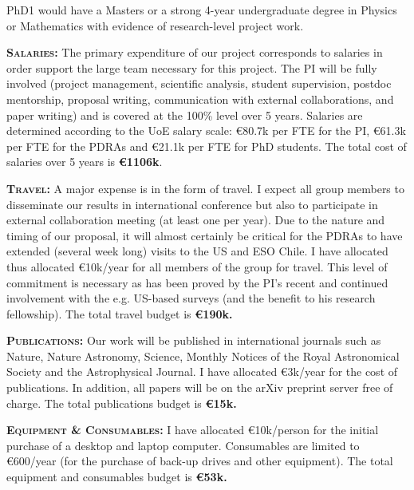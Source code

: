 \smallskip
\smallskip
\noindent
PhD1 would have a Masters or a strong 4-year undergraduate degree in
Physics or Mathematics with evidence of research-level project work.


\smallskip \smallskip
\noindent \textbf{\textsc{Salaries:}} The primary expenditure of our
project corresponds to salaries in order support the large team
necessary for this project.  The PI will be fully involved (project
management, scientific analysis, student supervision, postdoc
mentorship, proposal writing, communication with external
collaborations, and paper writing) and is covered at the 100\% level
over 5 years.  Salaries are determined according to the UoE salary
scale: \euro80.7k per FTE for the PI, \euro61.3k per FTE for the
PDRAs and \euro21.1k per FTE for PhD students.  The total cost of
salaries over 5 years is {\bf \euro 1106k}.

\smallskip \smallskip
\noindent \textbf{\textsc{Travel:}} A major expense is in the form of
travel. I expect all group members to disseminate our results in
international conference but also to participate in external
collaboration meeting (at least one per year). Due to the nature and
timing of our proposal, it will almost certainly be critical for the
PDRAs to have extended (several week long) visits to the US and ESO
Chile. I have allocated thus allocated \euro10k/year for all members
of the group for travel. This level of commitment is necessary as has
been proved by the PI's recent and continued involvement with the
e.g.  US-based surveys (and the benefit to his research
fellowship). The total travel budget is {\bf \euro190k.}

\smallskip
\smallskip
\noindent
\textbf{\textsc{Publications:}}
Our work will be published in international journals such as Nature,
Nature Astronomy, Science, Monthly Notices of the Royal Astronomical
Society and the Astrophysical Journal. I have allocated \euro3k/year for
the cost of publications. In addition, all papers will be on the arXiv
preprint server free of charge. The total publications budget is {\bf \euro15k.}

\smallskip
\smallskip
\noindent
\textbf{\textsc{Equipment \& Consumables:}}
I have allocated \euro10k/person for the initial purchase of a desktop
and laptop computer. Consumables are limited to \euro600/year (for the
purchase of back-up drives and other equipment). The total equipment
and consumables budget is {\bf \euro53k.}

